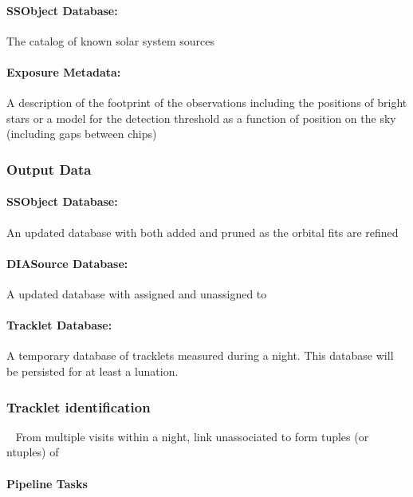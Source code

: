 \paragraph*{SSObject Database: } The catalog of known solar system sources

\paragraph*{Exposure Metadata:} A description of the footprint of the observations including the positions of bright stars or a model for the detection threshold as a function of position on the sky (including gaps between chips)


\subsubsection{Output Data}

\paragraph*{SSObject Database: } An updated \SSObject database with \SSObjects both added and pruned as the orbital fits are refined

\paragraph*{DIASource Database:} A updated \DIASource database with \DIASources assigned and unassigned to \SSObjects 

\paragraph*{Tracklet Database:} A temporary database of tracklets measured during a night. This database will be persisted for at least a lunation.

\subsubsection{Tracklet identification}~
From multiple visits within a night, link unassociated \DIASources to form tuples (or ntuples) of \DIASources

\paragraph{Pipeline Tasks}

